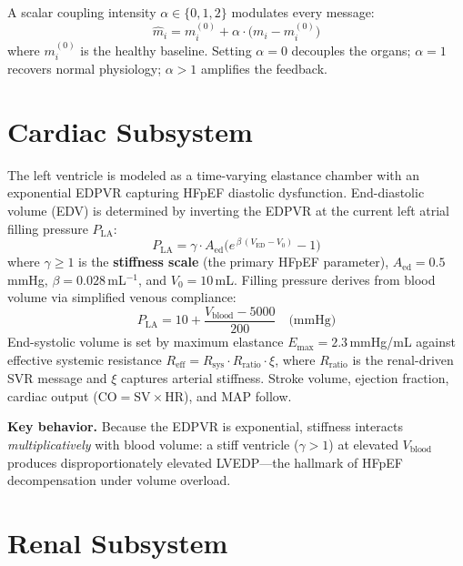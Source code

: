 \documentclass[10pt,twocolumn]{article}
\begin{document}
A scalar coupling intensity $\alpha \in \{0, 1, 2\}$ modulates every message:
\begin{equation}
\hat{m}_i = m_i^{(0)} + \alpha \cdot \bigl(m_i - m_i^{(0)}\bigr)
\label{eq:alpha}
\end{equation}
where $m_i^{(0)}$ is the healthy baseline. Setting $\alpha = 0$ decouples the organs; $\alpha = 1$ recovers normal physiology; $\alpha > 1$ amplifies the feedback.


\section{Cardiac Subsystem}
\label{sec:heart}

The left ventricle is modeled as a time-varying elastance chamber with an exponential EDPVR capturing HFpEF diastolic dysfunction. End-diastolic volume (EDV) is determined by inverting the EDPVR at the current left atrial filling pressure $P_{\text{LA}}$:
\begin{equation}
P_{\text{LA}} = \gamma \cdot A_{\text{ed}}\bigl(e^{\,\beta\,(V_{\text{ED}} - V_0)} - 1\bigr)
\label{eq:edpvr}
\end{equation}
where $\gamma \geq 1$ is the \textbf{stiffness scale} (the primary HFpEF parameter), $A_{\text{ed}} = 0.5$\,mmHg, $\beta = 0.028$\,mL$^{-1}$, and $V_0 = 10$\,mL. Filling pressure derives from blood volume via simplified venous compliance:
\begin{equation}
P_{\text{LA}} = 10 + \frac{V_{\text{blood}} - 5000}{200} \quad \text{(mmHg)}
\label{eq:pla}
\end{equation}
End-systolic volume is set by maximum elastance $E_{\max} = 2.3$\,mmHg/mL against effective systemic resistance $R_{\text{eff}} = R_{\text{sys}} \cdot R_{\text{ratio}} \cdot \xi$, where $R_{\text{ratio}}$ is the renal-driven SVR message and $\xi$ captures arterial stiffness. Stroke volume, ejection fraction, cardiac output ($\text{CO} = \text{SV} \times \text{HR}$), and MAP follow.

\textbf{Key behavior.} Because the EDPVR is exponential, stiffness interacts \emph{multiplicatively} with blood volume: a stiff ventricle ($\gamma > 1$) at elevated $V_{\text{blood}}$ produces disproportionately elevated LVEDP---the hallmark of HFpEF decompensation under volume overload.


\section{Renal Subsystem}
\label{sec:kidney}
\end{document}
